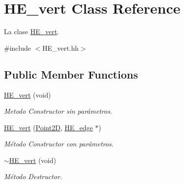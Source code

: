 \hypertarget{class_h_e__vert}{\section{H\-E\-\_\-vert Class Reference}
\label{class_h_e__vert}
}


La clase \hyperlink{class_h_e__vert}{H\-E\-\_\-vert}.  




{\ttfamily \#include $<$H\-E\-\_\-vert.\-hh$>$}

\subsection*{Public Member Functions}
\begin{DoxyCompactItemize}
\item 
\hypertarget{class_h_e__vert_a9e7ac7b249c9e4adbd61d9faf674ee1c}{\hyperlink{class_h_e__vert_a9e7ac7b249c9e4adbd61d9faf674ee1c}{H\-E\-\_\-vert} (void)}\label{class_h_e__vert_a9e7ac7b249c9e4adbd61d9faf674ee1c}

\begin{DoxyCompactList}\small\item\em Metodo Constructor sin parámetros. \end{DoxyCompactList}\item 
\hyperlink{class_h_e__vert_afe5995e97c6b556388b0d81000ca4224}{H\-E\-\_\-vert} (\hyperlink{class_point2_d}{Point2\-D}, \hyperlink{class_h_e__edge}{H\-E\-\_\-edge} $\ast$)
\begin{DoxyCompactList}\small\item\em Método Constructor con parámetros. \end{DoxyCompactList}\item 
\hypertarget{class_h_e__vert_a1db104715142137649876fb1f3d54238}{\hyperlink{class_h_e__vert_a1db104715142137649876fb1f3d54238}{$\sim$\-H\-E\-\_\-vert} (void)}\label{class_h_e__vert_a1db104715142137649876fb1f3d54238}

\begin{DoxyCompactList}\small\item\em Método Destructor. \end{DoxyCompactList}\end{DoxyCompactItemize}
